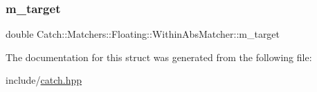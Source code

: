 \subsubsection{\texorpdfstring{m\_target}{m\_target}}
{\footnotesize\ttfamily double Catch\+::\+Matchers\+::\+Floating\+::\+Within\+Abs\+Matcher\+::m\+\_\+target\hspace{0.3cm}{\ttfamily [private]}}



The documentation for this struct was generated from the following file\+:\begin{DoxyCompactItemize}
\item 
include/\mbox{\hyperlink{catch_8hpp}{catch.\+hpp}}\end{DoxyCompactItemize}
